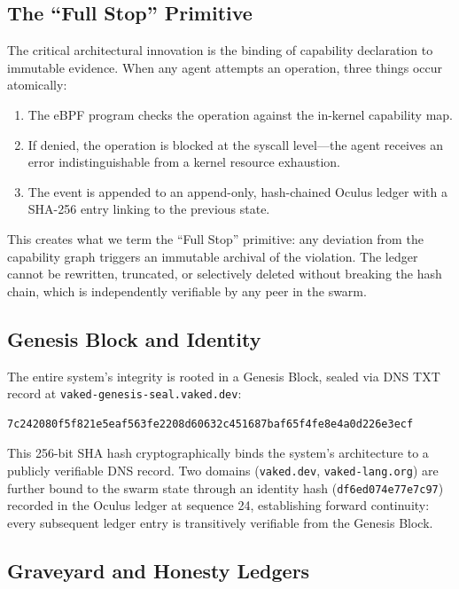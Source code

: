 \documentclass[conference]{IEEEtran}
\begin{document}
\subsection{The ``Full Stop'' Primitive}

The critical architectural innovation is the binding of capability declaration
to immutable evidence. When any agent attempts an operation, three things occur
atomically:

\begin{enumerate}
\item The eBPF program checks the operation against the in-kernel capability map.
\item If denied, the operation is blocked at the syscall level---the agent receives
an error indistinguishable from a kernel resource exhaustion.
\item The event is appended to an append-only, hash-chained Oculus ledger with a
SHA-256 entry linking to the previous state.
\end{enumerate}

This creates what we term the ``Full Stop'' primitive: any deviation from the
capability graph triggers an immutable archival of the violation. The ledger
cannot be rewritten, truncated, or selectively deleted without breaking the
hash chain, which is independently verifiable by any peer in the swarm.

\subsection{Genesis Block and Identity}

The entire system's integrity is rooted in a Genesis Block, sealed via DNS TXT
record at \texttt{vaked-genesis-seal.vaked.dev}:

\begin{lstlisting}[basicstyle=\ttfamily\scriptsize,breaklines=true]
7c242080f5f821e5eaf563fe2208d60632c451687baf65f4fe8e4a0d226e3ecf
\end{lstlisting}

This 256-bit SHA hash cryptographically binds the system's architecture to a
publicly verifiable DNS record. Two domains (\texttt{vaked.dev},
\texttt{vaked-lang.org}) are further bound to the swarm state through an
identity hash (\texttt{df6ed074e77e7c97}) recorded in the Oculus ledger at
sequence 24, establishing forward continuity: every subsequent ledger entry
is transitively verifiable from the Genesis Block.

\subsection{Graveyard and Honesty Ledgers}
\end{document}
